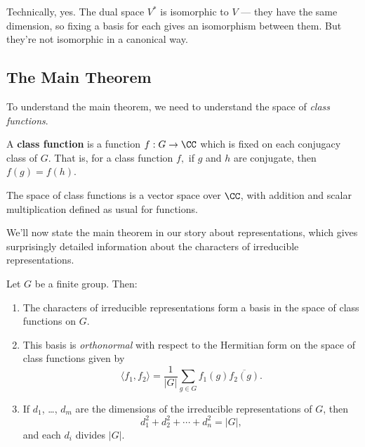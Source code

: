 \begin{ans}
Technically, yes. The dual space $V^*$ is isomorphic to $V$ --- they have the same dimension, so fixing a basis for each gives an isomorphism between them. But they're not isomorphic in a canonical way. 
\end{ans}


\subsection{The Main Theorem}

To understand the main theorem, we need to understand the space of \emph{class functions}.

\begin{definition}
A \textbf{class function} is a function $f : G \to \CC$ which is fixed on each conjugacy class of $G$. That is, for a class function $f,$ if $g$ and $h$ are conjugate, then $f(g) = f(h)$.
\end{definition}

The space of class functions is a vector space over $\CC$, with addition and scalar multiplication defined as usual for functions.

We'll now state the main theorem in our story about representations, which gives surprisingly detailed information about the characters of irreducible representations. 

\begin{theorem} \label{main theorem of rep theory}
Let $G$ be a finite group. Then:
\begin{enumerate}[label = (\alph*)]
    \item The characters of irreducible representations form a basis in the space of class functions on $G$.
    
    \item This basis is \emph{orthonormal} with respect to the Hermitian form on the space of class functions given by \[\langle f_1, f_2 \rangle = \frac{1}{|G|} \sum_{g \in G} f_1(g)\overline{f_2(g)}.\] 
    
    \item If $d_1$, \ldots, $d_m$ are the dimensions of the irreducible representations of $G$, then \[d_1^2 + d_2^2 + \cdots + d_n^2 = |G|,\] and each $d_i$ divides $|G|$.
\end{enumerate}
\end{theorem}

